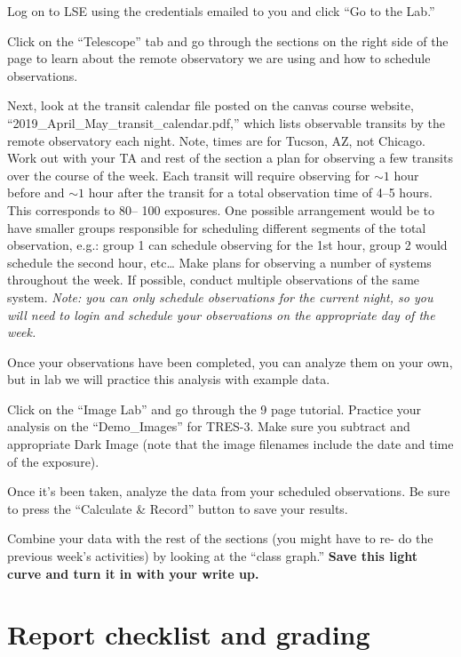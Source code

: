 Log on to LSE using the credentials emailed to you and click “Go to the
Lab.”

Click on the “Telescope” tab and go through the sections on the right
side of the page to learn about the remote observatory we are using and
how to schedule observations.

Next, look at the transit calendar file posted on the canvas course
website, “2019\_April\_May\_transit\_calendar.pdf,” which lists observable
transits by the remote observatory each night. Note, times are for
Tucson, AZ, not Chicago. Work out with your TA and rest of the section a
plan for observing a few transits over the course of the week. Each
transit will require observing for $\sim 1$ hour before and $\sim 1$ hour after the
transit for a total observation time of 4--5 hours. This corresponds to 80--
100 exposures. One possible arrangement would be to have smaller
groups responsible for scheduling different segments of the total
observation, e.g.: group 1 can schedule observing for the 1st hour, group
2 would schedule the second hour, etc\dots{} Make plans for observing a
number of systems throughout the week. If possible, conduct multiple
observations of the same system. \textit{Note: you can only schedule
observations for the current night, so you will need to login and
schedule your observations on the appropriate day of the week.}

Once your observations have been completed, you can analyze them on
your own, but in lab we will practice this analysis with example data.

Click on the “Image Lab” and go through the 9 page tutorial. Practice
your analysis on the “Demo\_Images” for TRES-3. Make sure you subtract
and appropriate Dark Image (note that the image filenames include the
date and time of the exposure).

Once it’s been taken, analyze the data from your scheduled
observations. Be sure to press the “Calculate \& Record” button to save
your results.

Combine your data with the rest of the sections (you might have to re-
do the previous week’s activities) by looking at the “class graph.” \textbf{Save this light curve and turn it in with your write up.}

\section{Report checklist and grading}

